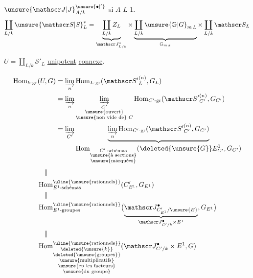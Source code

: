  ${\unsure{\mathscr J|J}}^{\unsure{\bullet|'}}_{A/k}$ si $A$  $L$  $1$.
\[
\coprod_{L/k}{\unsure{\mathscr S|S}}^*_L
=\underbrace{\coprod_{L/k}Z_L}_{\mathscr J^*_{L/k}}
\times\underbrace{\coprod_{L/k}\unsure{\mathbb G|G}_{m\,L}}_{\mathbb G_{m\,k}}
\times\coprod_{L/k}\mathscr S_L
\]

$U=\coprod_{L/k}\mathscr S'_L$  \uline{unipotent} \uline{connexe}.

\[
\begin{aligned}
\operatorname{Hom}_{k\text{-gr}}(U,G)
&=\varinjlim_n\operatorname{Hom}_{L\text{-gr}}({\mathscr S'}^{(n)}_L,G_L)\\
&=\varinjlim_n\varinjlim_{\substack{C'\\\text{\unsure{ouvert}}\\\text{\unsure{non vide de} $C$}}}
\operatorname{Hom}_{C'\text{-gr}}({\mathscr S'}^{(n)}_{C'},G_{C'})\\
&=\varinjlim_{C'}\underbrace{\varinjlim_n\operatorname{Hom}_{C'\text{-gr}}({\mathscr S'}^{(n)}_{C'},G_{C'})}_{\displaystyle\operatorname{Hom}_{\substack{C'\text{-schémas}\\\text{\unsure{à sections}}\\\text{\unsure{marquées}}}}(\deleted{\unsure{G}}E^1_{C'},G_{C'})}
\end{aligned}
\]
\[
\begin{aligned}
&\quad\Vert\\
&\operatorname{Hom}^{\text{\uline{\unsure{rationnels}}}}_{E^1\text{-schémas}}(C'_{E^1},G_{E^1})\\
&\quad\Vert\\
&\operatorname{Hom}^{\text{\uline{\unsure{rationnels}}}}_{E^1\text{-groupes}}
\bigl(\underbrace{\mathscr J^{\bullet}_{C'_{E^1}/\unsure{E}}}_{\mathscr J^{\bullet}_{C'/k}\times E^1},G_{E^1}\bigr)\\
&\quad\Vert\\
&\operatorname{Hom}^{\text{\uline{\unsure{rationnels}}}}_{\substack{\deleted{\unsure{k}}\\\text{\deleted{\unsure{groupes}}}\\\text{\unsure{multiplicatifs}}\\\text{\unsure{en les facteurs}}\\\text{\unsure{du groupe}}}}
(\mathscr J^{\bullet}_{C'/k}\times E^1,G)
\end{aligned}
\]
